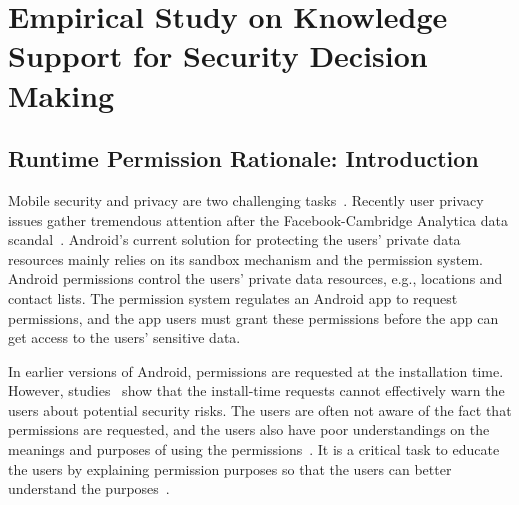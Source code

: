 
\chapter{Empirical Study on Knowledge Support for Security Decision Making}
\label{ch3:runtime}

\section{Runtime Permission Rationale: Introduction}
\label{sec:intro}


Mobile security and privacy are two challenging tasks~\cite{journals/tocs/EnckGHTCCJMS14,conf/ccs/FeltCHSW11,conf/soups/FeltHEHCW12,conf/chi/AlmuhimediSSAAG15,conf/huc/LinSALHZ12,conf/soups/LinLSH14,yang2015appcontext}.
Recently user privacy issues gather tremendous attention after the Facebook-Cambridge Analytica data scandal~\cite{facebookleak}. 
Android's current solution for protecting the users' private data resources mainly relies on its sandbox mechanism and the permission system. 
Android permissions control the users' private data resources, e.g., locations and contact lists. 
The permission system regulates an Android app to request permissions, and the app users must grant these permissions before the app can get access to the users' sensitive data. 

In earlier versions of Android, permissions are requested at the installation time.
However, studies~\cite{conf/soups/FeltHEHCW12,conf/huc/LinSALHZ12} show that the install-time requests cannot effectively warn the users about potential security risks. 
The users are often not aware of the fact that permissions are requested, and the users also have poor understandings on the meanings and purposes of using the permissions~\cite{conf/soups/FeltHEHCW12,conf/fc/KelleyCCJSW12}. 
It is a critical task to educate the users by explaining permission purposes so that the users can better understand the purposes~\cite{conf/huc/LinSALHZ12,conf/uss/PanditaXYEX13,clap}.


